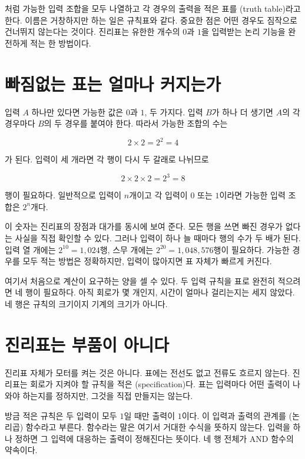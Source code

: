 

처럼 가능한 입력 조합을 모두 나열하고 각 경우의 출력을 적은 표를 (truth table)라고 한다. 이름은 거창하지만 하는 일은 규칙표와 같다. 중요한 점은 어떤 경우도 짐작으로 건너뛰지 않는다는 것이다. 진리표는 유한한 개수의 \(0\)과 \(1\)을 입력받는 논리 기능을 완전하게 적는 한 방법이다\parencite{mit6004truth}.

\section{빠짐없는 표는 얼마나 커지는가}

입력 \(A\) 하나만 있다면 가능한 값은 \(0\)과 \(1\), 두 가지다. 입력 \(B\)가 하나 더 생기면 \(A\)의 각 경우마다 \(B\)의 두 경우를 붙여야 한다. 따라서 가능한 조합의 수는

\[
  2\times2=2^2=4
\]

가 된다. 입력이 세 개라면 각 행이 다시 두 갈래로 나뉘므로

\[
  2\times2\times2=2^3=8
\]

행이 필요하다. 일반적으로 입력이 \(n\)개이고 각 입력이 \(0\) 또는 \(1\)이라면 가능한 입력 조합은 \(2^n\)개다.

이 숫자는 진리표의 장점과 대가를 동시에 보여 준다. 모든 행을 쓰면 빠진 경우가 없다는 사실을 직접 확인할 수 있다. 그러나 입력이 하나 늘 때마다 행의 수가 두 배가 된다. 입력 열 개에는 \(2^{10}=1{,}024\)행, 스무 개에는 \(2^{20}=1{,}048{,}576\)행이 필요하다. 가능한 경우를 모두 적는 방법은 정확하지만, 입력이 많아지면 표 자체가 빠르게 커진다.

여기서 처음으로 계산이 요구하는 양을 셀 수 있다. 두 입력 규칙을 표로 완전히 적으려면 네 행이 필요하다. 아직 회로가 몇 개인지, 시간이 얼마나 걸리는지는 세지 않았다. 네 행은 규칙의 크기이지 기계의 크기가 아니다.

\section{진리표는 부품이 아니다}

진리표 자체가 모터를 켜는 것은 아니다. 표에는 전선도 없고 전류도 흐르지 않는다. 진리표는 회로가 지켜야 할 규칙을 적은 (specification)다. 표는 입력마다 어떤 출력이 나와야 하는지를 정하지만, 그것을 직접 만들지는 않는다.

방금 적은 규칙은 두 입력이 모두 \(1\)일 때만 출력이 \(1\)이다. 이 입력과 출력의 관계를 (논리곱) 함수라고 부른다. 함수라는 말은 여기서 거대한 수식을 뜻하지 않는다. 입력을 하나 정하면 그 입력에 대응하는 출력이 정해진다는 뜻이다. 네 행 전체가 AND 함수의 약속이다.

